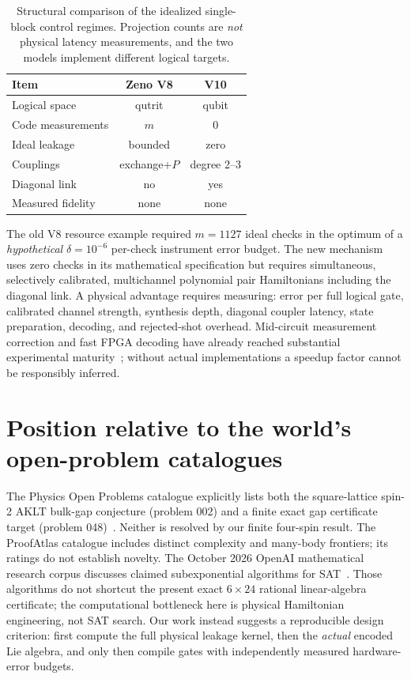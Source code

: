 \documentclass[aps,pra,twocolumn,nofootinbib,superscriptaddress,10pt]{revtex4-2}
\begin{document}
\begin{table}[t]
\caption{Structural comparison of the idealized single-block control regimes. Projection counts are \emph{not} physical latency measurements, and the two models implement different logical targets.}\label{tab:comparison}
\begin{ruledtabular}\begin{tabular}{lcc}
Item & Zeno V8 & V10 \\\hline
Logical space & qutrit & qubit\\
Code measurements & $m$ & 0\\
Ideal leakage & bounded & zero\\
Couplings & exchange+$P$ & degree 2--3\\
Diagonal link & no & yes\\
Measured fidelity & none & none
\end{tabular}\end{ruledtabular}
\end{table}
The old V8 resource example required $m=1127$ ideal checks in the optimum of a \emph{hypothetical} $\delta=10^{-6}$ per-check instrument error budget. The new mechanism uses zero checks in its mathematical specification but requires simultaneous, selectively calibrated, multichannel polynomial pair Hamiltonians including the diagonal link. A physical advantage requires measuring: error per full logical gate, calibrated channel strength, synthesis depth, diagonal coupler latency, state preparation, decoding, and rejected-shot overhead. Mid-circuit measurement correction and fast FPGA decoding have already reached substantial experimental maturity~\cite{QEC2026,Readout}; without actual implementations a speedup factor cannot be responsibly inferred.

\section{Position relative to the world's open-problem catalogues}
The Physics Open Problems catalogue explicitly lists both the square-lattice spin-2 AKLT bulk-gap conjecture (problem 002) and a finite exact gap certificate target (problem 048)~\cite{Problems}. Neither is resolved by our finite four-spin result. The ProofAtlas catalogue includes distinct complexity and many-body frontiers; its ratings do not establish novelty. The October 2026 OpenAI mathematical research corpus discusses claimed subexponential algorithms for SAT~\cite{OpenAIMath}. Those algorithms do not shortcut the present exact $6\times24$ rational linear-algebra certificate; the computational bottleneck here is physical Hamiltonian engineering, not SAT search. Our work instead suggests a reproducible design criterion: first compute the full physical leakage kernel, then the \emph{actual} encoded Lie algebra, and only then compile gates with independently measured hardware-error budgets.
\end{document}
